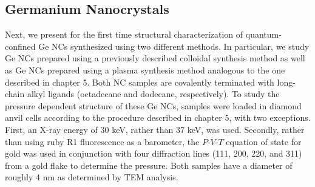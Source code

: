\subsection{Germanium Nanocrystals}
Next, we present for the first time structural characterization of quantum-confined Ge NCs synthesized using two different methods. In particular, we study Ge NCs prepared using a previously described colloidal synthesis method \cite{lee2009colloidal} as well as Ge NCs prepared using a plasma synthesis method \cite{wheeler2013tunable} analogous to the one described in chapter 5. Both NC samples are covalently terminated with long-chain alkyl ligands (octadecane and dodecane, respectively). To study the pressure dependent structure of these Ge NCs, samples were loaded in diamond anvil cells according to the procedure described in chapter 5, with two exceptions. First, an X-ray energy of 30 keV, rather than 37 keV, was used. Secondly, rather than using ruby R1 fluorescence as a barometer, the $P$-$V$-$T$ equation of state for gold \cite{anderson1989anharmonicity} was used in conjunction with four diffraction lines (111, 200, 220, and 311) from a gold flake to determine the pressure. Both samples have a diameter of roughly 4 nm as determined by TEM analysis.

